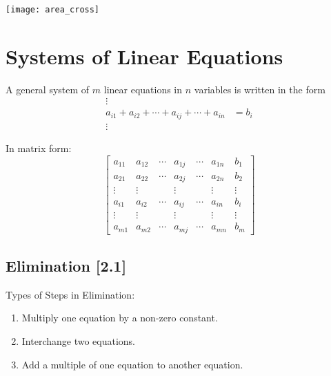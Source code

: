 \documentclass[a4paper,9pt]{extarticle}
\begin{document}
\begin{multicols*}{2}
{\centering \texttt{[image: area\_cross]} \par}




\section{Systems of Linear Equations}
A general system of $m$ linear equations in $n$ variables is written in the form
\begin{equation} \label{2.1-1}
    \begin{split}
        \vdots & \\
        a_{i1} + a_{i2} + \cdots + a_{ij} + \cdots + a_{in} & = b_i \\
        \vdots &
    \end{split}
\end{equation}

In matrix form:
\begin{equation} \label{2.1-2}
    \left[
    \begin{array}{cccccc|c}
        a_{11} & a_{12} & \cdots & a_{1j} & \cdots & a_{1n} & b_1 \\ 
        a_{21} & a_{22} & \cdots & a_{2j} & \cdots & a_{2n} & b_2 \\
        \vdots & \vdots & \ & \vdots & \ & \vdots & \vdots \\
        a_{i1} & a_{i2} & \cdots & a_{ij} & \cdots & a_{in} & b_i \\
        \vdots & \vdots & \ & \vdots & \ & \vdots & \vdots \\
        a_{m1} & a_{m2} & \cdots & a_{mj} & \cdots & a_{mn} & b_m
    \end{array}
    \right]
\end{equation}


\subsection{Elimination [2.1]}
Types of Steps in Elimination:
\begin{enumerate}[label=\bfseries (\arabic*)] \itemsep0pt \parskip0pt 
    \item Multiply one equation by a non-zero constant.
    \item Interchange two equations.
    \item Add a multiple of one equation to another equation.
\end{enumerate}


\end{multicols*}
\end{document}
